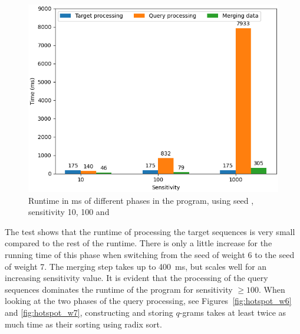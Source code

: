 \documentclass[twoside,a4paper,bsc]{master}
\begin{document}
\begin{figure}
\centering
\includegraphics[scale=0.6]{graphics/program_w7.png}
\caption{Runtime in ms of different phases in the program,
using seed , sensitivity 10, 100 and }
\label{fig:program_w7}
\end{figure}

The test shows that the runtime of processing the target sequences is very small
compared to the rest of the runtime. There is only a little increase for the
running time of this phase when switching from the seed 
of weight 6 to the seed  of weight 7.
The merging step takes up to 400~ms, but scales well for an increasing
sensitivity value. It is evident that the processing of the query sequences
dominates the runtime of the program for sensitivity \(\geq 100\).
When looking at the two phases of the query processing,
see Figures~\ref{fig:hotspot_w6} and \ref{fig:hotspot_w7}, constructing and
storing \(q\)-grams takes at least twice as much time
as their sorting using radix sort.
\end{document}
